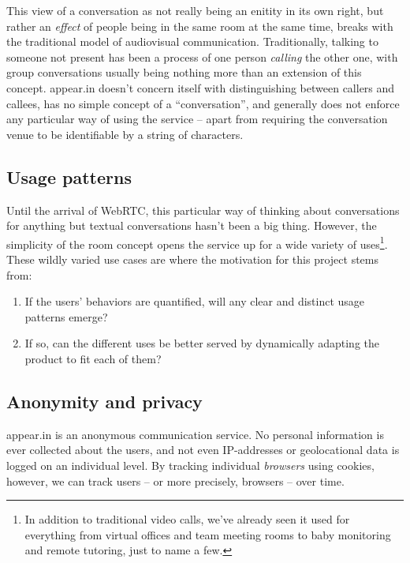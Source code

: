 This view of a conversation as not really being an enitity in its own right, but rather an \emph{effect} of people being in the same room at the same time, breaks with the traditional model of audiovisual communication. Traditionally, talking to someone not present has been a process of one person \emph{calling} the other one, with group conversations usually being nothing more than an extension of this concept. appear.in doesn't concern itself with distinguishing between callers and callees, has no simple concept of a ``conversation'', and generally does not enforce any particular way of using the service -- apart from requiring the conversation venue to be identifiable by a string of characters.

\subsection{Usage patterns}

Until the arrival of WebRTC, this particular way of thinking about conversations for anything but textual conversations hasn't been a big thing. However, the simplicity of the room concept opens the service up for a wide variety of uses\footnote{In addition to traditional video calls, we've already seen it used for everything from virtual offices and team meeting rooms to baby monitoring and remote tutoring, just to name a few.}. These wildly varied use cases are where the motivation for this project stems from:

\begin{enumerate}
  \item If the users' behaviors are quantified, will any clear and distinct usage patterns emerge?
  \item If so, can the different uses be better served by dynamically adapting the product to fit each of them?
\end{enumerate}

\subsection{Anonymity and privacy}
\label{sub:anonymity_privacy}

appear.in is an anonymous communication service. No personal information is ever collected about the users, and not even IP-addresses or geolocational data is logged on an individual level. By tracking individual \emph{browsers} using cookies, however, we can track users -- or more precisely, browsers -- over time.

